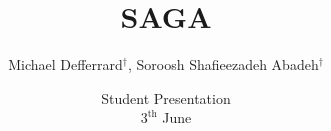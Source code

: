 \documentclass[11Pt,t,compress]{beamer}
\title[]{SAGA}
\author[Advance Topics in Data Science: Spring 2016]{Michael Defferrard$^\dagger$, Soroosh Shafieezadeh Abadeh$^\dagger$}
\institute{$^\dagger$ Ecole Polytechnique Federale de Lausanne}
\date{Student Presentation\\$3^{\text{th}}$ June}
\theoremstyle{definition}
\begin{document}
\frame{\titlepage}


\end{document}
